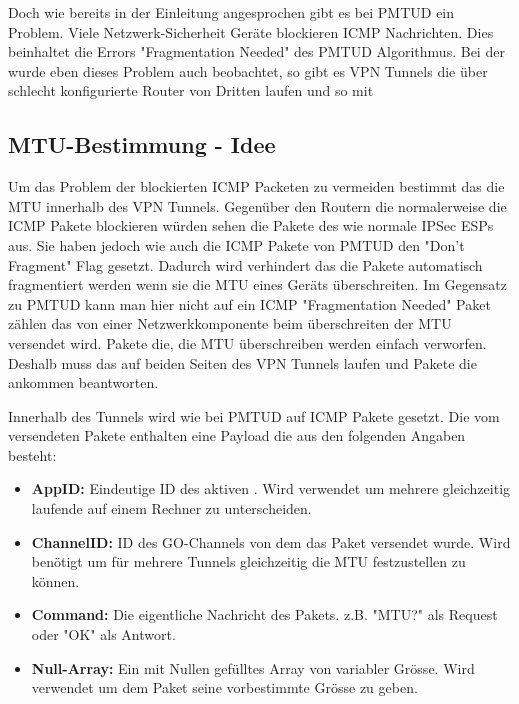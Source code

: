 Doch wie bereits in der Einleitung angesprochen gibt es bei \acs{PMTUD} ein Problem. Viele Netzwerk-Sicherheit Geräte blockieren \acs{ICMP} Nachrichten. Dies beinhaltet die Errors "Fragmentation Needed" des \acs{PMTUD} Algorithmus. Bei der \osag wurde eben dieses Problem auch beobachtet, so gibt es \acs{VPN} Tunnels die über schlecht konfigurierte Router von Dritten laufen und so mit


\subsection{MTU-Bestimmung - Idee}
Um das Problem der blockierten \acs{ICMP} Packeten zu vermeiden bestimmt das \tool die \acs{MTU} innerhalb des \acs{VPN} Tunnels. Gegenüber den Routern die normalerweise die \acs{ICMP} Pakete blockieren würden sehen die Pakete des \tool wie normale \acs{IPSec} \acs{ESP}s aus. Sie haben jedoch wie auch die \acs{ICMP} Pakete von \acs{PMTUD} den "Don't Fragment" Flag gesetzt. Dadurch wird verhindert das die Pakete automatisch fragmentiert werden wenn sie die \acs{MTU} eines Geräts überschreiten. Im Gegensatz zu \acs{PMTUD} kann man hier nicht auf ein \acs{ICMP} "Fragmentation Needed" Paket zählen das von einer Netzwerkkomponente beim überschreiten der \acs{MTU} versendet wird. Pakete die, die \acs{MTU} überschreiben werden einfach verworfen. Deshalb muss das \tool auf beiden Seiten des \acs{VPN} Tunnels laufen und Pakete die ankommen beantworten.

Innerhalb des Tunnels wird wie bei \acs{PMTUD} auf \acs{ICMP} Pakete gesetzt. Die vom \tool versendeten Pakete enthalten eine Payload die aus den folgenden Angaben besteht:

\begin{itemize}
  \item \textbf{AppID:} Eindeutige ID des aktiven \tool. Wird verwendet um mehrere gleichzeitig laufende \tool auf einem Rechner zu unterscheiden.
  \item \textbf{ChannelID:} ID des GO-Channels von dem das Paket versendet wurde. Wird benötigt um für mehrere Tunnels gleichzeitig die \acs{MTU} festzustellen zu können.
  \item \textbf{Command:} Die eigentliche Nachricht des Pakets. z.B. "MTU?" als Request oder "OK" als Antwort.
  \item \textbf{Null-Array:} Ein mit Nullen gefülltes Array von variabler Grösse. Wird verwendet um dem Paket seine vorbestimmte Grösse zu geben.
\end{itemize}


